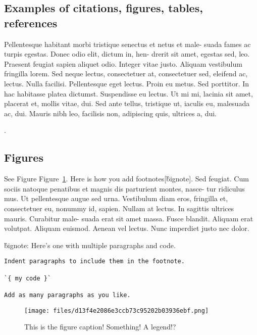 \documentclass[ twocolumns, longauth ]{aa}
\begin{document}
\subsection{Examples of citations, figures, tables, references}\label{sec:others}

Pellentesque habitant morbi tristique senectus et netus et male-
suada fames ac turpis egestas. Donec odio elit, dictum in, hen-
drerit sit amet, egestas sed, leo. Praesent feugiat sapien aliquet
odio. Integer vitae justo. Aliquam vestibulum fringilla lorem.
Sed neque lectus, consectetuer at, consectetuer sed, eleifend ac,
lectus. Nulla facilisi. Pellentesque eget lectus. Proin eu metus.
Sed porttitor. In hac habitasse platea dictumst. Suspendisse
eu lectus. Ut mi mi, lacinia sit amet, placerat et, mollis vitae,
dui. Sed ante tellus, tristique ut, iaculis eu, malesuada ac, dui.
Mauris nibh leo, facilisis non, adipiscing quis, ultrices a, dui.

\citet{kour2014real, kour2014fast}  \citep{hadash2018estimate}.

\subsection{Figures}

See Figure Figure~\ref{fig-fig1}.
Here is how you add footnotes[\^bignote]. Sed feugiat. Cum
sociis natoque penatibus et magnis dis parturient montes, nasce-
tur ridiculus mus. Ut pellentesque augue sed urna. Vestibulum
diam eros, fringilla et, consectetuer eu, nonummy id, sapien.
Nullam at lectus. In sagittis ultrices mauris. Curabitur male-
suada erat sit amet massa. Fusce blandit. Aliquam erat volutpat.
Aliquam euismod. Aenean vel lectus. Nunc imperdiet justo nec
dolor.

\^bignote: Here's one with multiple paragraphs and code.

\begin{verbatim}
Indent paragraphs to include them in the footnote.

`{ my code }`

Add as many paragraphs as you like.
\end{verbatim}

\begin{figure}[!htbp]
\centering
\texttt{[image: files/d13f4e2086e3ccb73c95202b03936ebf.png]}
\caption[]{This is the figure caption!
Something! A legend!?}
\label{fig-fig1}
\end{figure}




\end{document}
